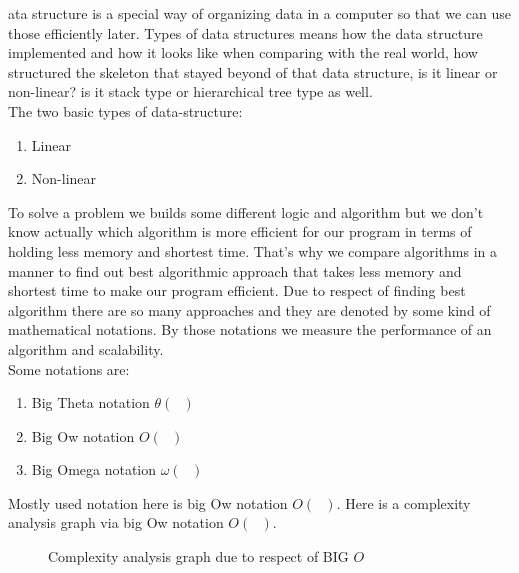 \justify
{
ata structure is a special way of organizing data in a computer so that we can use those efficiently later. Types of data structures means how the data structure implemented and how it looks like when comparing with the real world, how structured the skeleton that stayed beyond of that data structure, is it linear or non-linear? is it stack type or hierarchical tree type as well.\\
The two basic types of data-structure:
\begin{enumerate}
	\item Linear
	\item Non-linear
\end{enumerate}
To solve a problem we builds some different logic and algorithm but we don't know actually which algorithm is more efficient for our program in terms of holding less memory and shortest time. That's why we compare algorithms in a manner to find out best algorithmic approach that takes less memory and shortest time to make our program efficient. Due to respect of finding best algorithm there are so many approaches and they are denoted by some kind of mathematical notations. By those notations we measure the performance of an algorithm and scalability.\\
Some notations are:
\begin{enumerate}
	\item Big Theta notation $\theta(\textrm{ })$
	\item Big Ow notation $O(\textrm{ })$
	\item Big Omega notation $\omega(\textrm{ })$
\end{enumerate}
 Mostly used notation here is big Ow notation $O(\textrm{ })$. Here is a complexity analysis graph via big Ow notation $O(\textrm{ })$.
}
	\begin{figure}[h!]
	\centering
	\caption{Complexity analysis graph due to respect of BIG $O$}
	\end{figure}